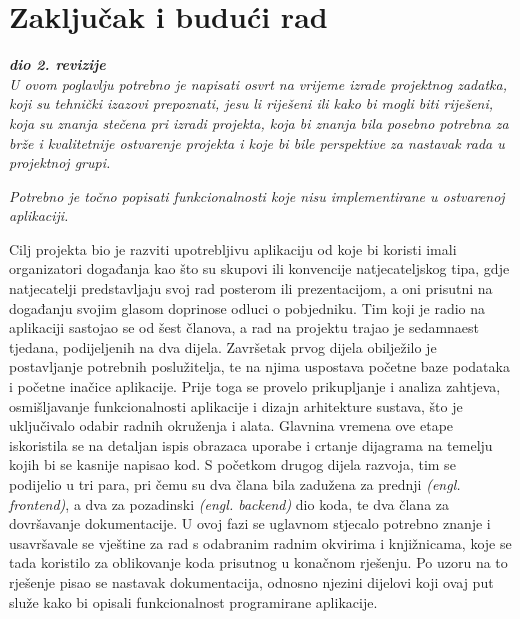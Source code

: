 \chapter{Zaključak i budući rad}
		
		\textbf{\textit{dio 2. revizije}}\\
		
		 \textit{U ovom poglavlju potrebno je napisati osvrt na vrijeme izrade projektnog zadatka, koji su tehnički izazovi prepoznati, jesu li riješeni ili kako bi mogli biti riješeni, koja su znanja stečena pri izradi projekta, koja bi znanja bila posebno potrebna za brže i kvalitetnije ostvarenje projekta i koje bi bile perspektive za nastavak rada u projektnoj grupi.}
		
		 \textit{Potrebno je točno popisati funkcionalnosti koje nisu implementirane u ostvarenoj aplikaciji.}
		 
		 Cilj projekta bio je razviti upotrebljivu aplikaciju od koje bi koristi imali organizatori događanja kao što su skupovi ili konvencije natjecateljskog tipa, gdje natjecatelji predstavljaju svoj rad posterom ili prezentacijom, a oni prisutni na događanju svojim glasom doprinose odluci o pobjedniku.
		 Tim koji je radio na aplikaciji sastojao se od šest članova, a rad na projektu trajao je sedamnaest tjedana, podijeljenih na dva dijela.
		 Završetak prvog dijela obilježilo je postavljanje potrebnih poslužitelja, te na njima uspostava početne baze podataka i početne inačice aplikacije. Prije toga se provelo prikupljanje i analiza zahtjeva, osmišljavanje funkcionalnosti aplikacije i dizajn arhitekture sustava, što je uključivalo odabir radnih okruženja i alata. Glavnina vremena ove etape iskoristila se na detaljan ispis obrazaca uporabe i crtanje dijagrama na temelju kojih bi se kasnije napisao kod.
		 S početkom drugog dijela razvoja, tim se podijelio u tri para, pri čemu su dva člana bila zadužena za prednji \textit{(engl. frontend)}, a dva za pozadinski \textit{(engl. backend)} dio koda, te dva člana za dovršavanje dokumentacije. U ovoj fazi se uglavnom stjecalo potrebno znanje i usavršavale se vještine za rad s odabranim radnim okvirima i knjižnicama, koje se tada koristilo za oblikovanje koda prisutnog u konačnom rješenju. Po uzoru na to rješenje pisao se nastavak dokumentacija, odnosno njezini dijelovi koji ovaj put služe kako bi opisali funkcionalnost programirane aplikacije.
		
		\eject 